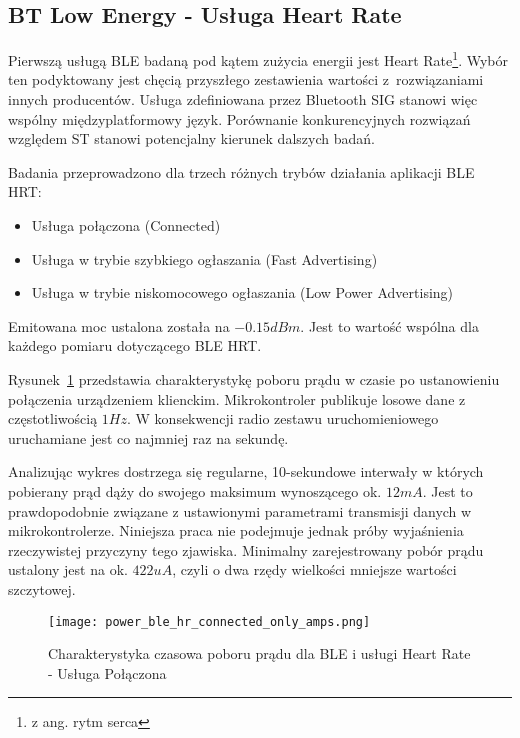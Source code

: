 \subsection{BT Low Energy - Usługa Heart Rate}

Pierwszą usługą BLE badaną pod kątem zużycia energii jest Heart Rate\footnote{z ang. rytm serca}. Wybór
ten podyktowany jest chęcią przyszłego zestawienia wartości z~rozwiązaniami innych producentów.
Usługa zdefiniowana przez Bluetooth SIG stanowi więc wspólny międzyplatformowy język.
Porównanie konkurencyjnych rozwiązań względem ST stanowi potencjalny kierunek dalszych badań.

Badania przeprowadzono dla trzech różnych trybów działania aplikacji BLE HRT:
\begin{itemize}
\item Usługa połączona (Connected)
\item Usługa w trybie szybkiego ogłaszania (Fast Advertising)
\item Usługa w trybie niskomocowego ogłaszania (Low Power Advertising)
\end{itemize}

Emitowana moc ustalona została na $-0.15dBm$. Jest to wartość wspólna dla każdego pomiaru
dotyczącego BLE HRT.

Rysunek~\ref{rys:power_ble_hr_connected_only_amps} przedstawia charakterystykę poboru prądu
w czasie po ustanowieniu połączenia urządzeniem klienckim. Mikrokontroler publikuje 
losowe dane z częstotliwością $1Hz$. W konsekwencji radio zestawu uruchomieniowego
uruchamiane jest co najmniej raz na sekundę.

Analizując wykres dostrzega się regularne, 10-sekundowe interwały w których pobierany prąd dąży do swojego
maksimum wynoszącego ok. $12mA$. Jest to prawdopodobnie związane z ustawionymi parametrami transmisji
danych w mikrokontrolerze. Niniejsza praca nie podejmuje jednak próby wyjaśnienia rzeczywistej przyczyny tego zjawiska.
Minimalny zarejestrowany pobór prądu ustalony jest na ok. $422uA$, czyli o dwa rzędy wielkości mniejsze wartości
szczytowej.


\begin{figure}[!htb]
	\centering \texttt{[image: power\_ble\_hr\_connected\_only\_amps.png]}
	\caption{Charakterystyka czasowa poboru prądu dla BLE i usługi Heart Rate - Usługa Połączona}
	\label{rys:power_ble_hr_connected_only_amps}
\end{figure}

